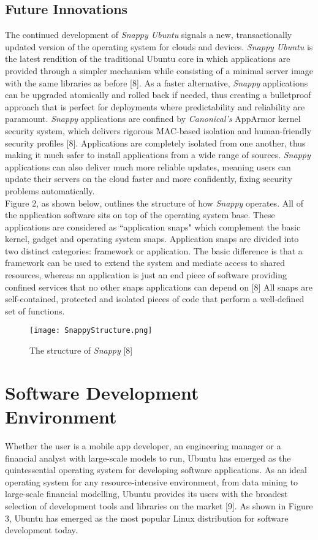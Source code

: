 \documentclass[11pt]{article}
\newcommand{\forceindent}{\leavevmode{\parindent=1em\indent}}
\begin{document}
\subsection{Future Innovations}
\forceindent The continued development of \emph{Snappy Ubuntu} signals a new, transactionally updated version of the operating system for clouds and devices. \emph{Snappy Ubuntu} is the latest rendition of the traditional Ubuntu core in which applications are provided through a simpler mechanism while consisting of a minimal server image with the same libraries as before [8]. As a faster alternative, \emph{Snappy} applications can be upgraded atomically and rolled back if needed, thus creating a bulletproof approach that is perfect for deployments where predictability and reliability are paramount. \emph{Snappy} applications are confined by \emph{Canonical's} AppArmor kernel security system, which delivers rigorous MAC-based isolation and human-friendly security profiles [8]. Applications are completely isolated from one another, thus making it much safer to install applications from a wide range of sources. \emph{Snappy} applications can also deliver much more reliable updates, meaning users can update their servers on the cloud faster and more confidently, fixing security problems automatically.\\

Figure 2, as shown below, outlines the structure of how \emph{Snappy} operates.
All of the application software sits on top of the operating system base. These applications are considered as ``application snaps" which complement the basic kernel, gadget and operating system snaps. Application snaps are divided into two distinct categories: framework or application. The basic difference is that a framework can be used to extend the system and mediate access to shared resources, whereas an application is just an end piece of software providing confined services that no other snaps applications can depend on [8] All snaps are self-contained, protected and isolated pieces of code that perform a well-defined set of functions.\\


\begin{figure}[h!]
  \centering
    \caption{The structure of \emph{Snappy} [8]}
{\texttt{[image: SnappyStructure.png]}}
\end{figure}



\section{Software Development Environment}
\forceindent Whether the user is a mobile app developer, an engineering manager or a financial analyst with large-scale models to run, Ubuntu has emerged as the quintessential operating system for developing software applications. As an ideal operating system for any resource-intensive environment, from data mining to large-scale financial modelling, Ubuntu provides its users with the broadest selection of development tools and libraries on the market [9]. As shown in Figure 3, Ubuntu has emerged as the most popular Linux distribution for software development today. \\
\end{document}
